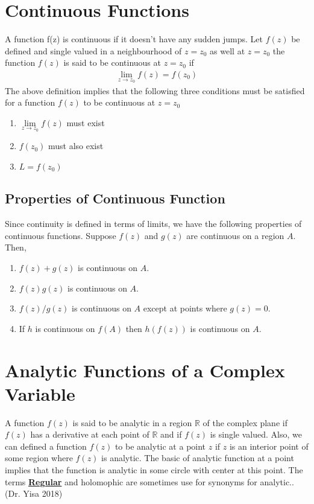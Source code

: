 \documentclass[11pt]{report}
\newcommand{\ubt}[1]{\textbf{\underline{#1}}}
\newcommand{\real}{ \mathbb{R}}
\begin{document}
	\section{Continuous Functions}
	A function f(z) is continuous if it doesn't have any sudden jumps. Let $f(z)$ be defined and single valued in a neighbourhood of $z=z_0$ as well at $z=z_0$ the function $f(z)$ is said to be continuous at $z=z_0$ if
	\begin{eqnarray}
		\lim\limits_{z\rightarrow z_0} f(z) = f(z_0)\label{eq:2_5}
	\end{eqnarray}
	The above definition implies that the following three conditions must be satisfied for a function $f(z)$ to be continuous at $z=z_0$
	\begin{enumerate}
		\item $\lim\limits_{z\rightarrow z_0} f(z)$ must exist
		\item $f(z_0)$ must also exist
		\item $L = f(z_0)$
	\end{enumerate}
	
	\subsection{Properties of Continuous Function}
	Since continuity is defined in terms of limits, we have the following properties of continuous functions. Suppose $f(z)$ and $g(z)$ are continuous on a region $A$. Then,
	\begin{enumerate}
		\item $f(z)+g(z)$ is continuous on $A$.
		\item $f(z)g(z)$ is continuous on $A$.
		\item $f(z)/g(z)$ is continuous on $A$ except at points where $g(z)=0$.
		\item If $h$ is continuous on $f(A)$ then $h(f(z))$ is continuous on $A$.
	\end{enumerate}

	\section{Analytic Functions of a Complex Variable}
	A function $f(z)$ is said to be analytic in a region $\real$ of the complex plane if $f(z)$ has a derivative at each point of $\real$ and if $f(z)$ is single valued. Also, we can defined a function $f(z)$ to be analytic at a point $z$ if $z$ is an interior point of some region where $f(z)$ is analytic. The basic of analytic function at a point implies that the function is analytic in some circle with center at this point. The terms \ubt{Regular} and holomophic are sometimes use for synonyms for analytic..(Dr. Yisa 2018)\\
	
\end{document}
